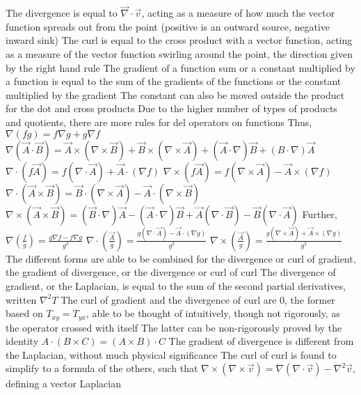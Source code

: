 \documentclass[11 pt, twoside]{article}
\newenvironment{outline*}
{
	\begin{outline}[enumerate]
	}
	{\end{outline}
}
\begin{document}
\begin{outline*}
		\3 The divergence is equal to $\vec{\nabla} \cdot \vec{v}$, acting as a measure of how much the vector function spreads out from the point (positive is an outward source, negative inward sink)
		\3 The curl is equal to the cross product with a vector function, acting as a measure of the vector function swirling around the point, the direction given by the right hand rule
	\2 The gradient of a function sum or a constant multiplied by a function is equal to the sum of the gradients of the functions or the constant multiplied by the gradient
		\3 The constant can also be moved outside the product for the dot and cross products
	\2 Due to the higher number of types of products and quotients, there are more rules for del operators on functions
		\3 Thus, $\nabla(fg) = f\nabla g + g\nabla f$
			\4 $\nabla(\vec{A} \cdot \vec{B}) = \vec{A} \times (\nabla \times \vec{B}) + \vec{B} \times (\nabla \times \vec{A}) + (\vec{A} \cdot \nabla)\vec{B} + (B \cdot \nabla)\vec{A}$
			\4 $\nabla \cdot (f\vec{A}) = f(\nabla \cdot \vec{A}) + \vec{A} \cdot (\nabla f)$
			\4 $\nabla \times (f\vec{A}) = f(\nabla \times \vec{A}) - \vec{A} \times (\nabla f)$
			\4 $\nabla \cdot (\vec{A} \times \vec{B}) = \vec{B} \cdot (\nabla \times \vec{A}) - \vec{A} \cdot (\nabla \times \vec{B})$
			\4 $\nabla \times (\vec{A} \times \vec{B}) = (\vec{B} \cdot \nabla)\vec{A} - (\vec{A} \cdot \nabla)\vec{B} + \vec{A}(\nabla \cdot \vec{B}) - \vec{B}(\nabla \cdot \vec{A})$
		\3 Further, $\nabla (\frac{f}{g}) = \frac{g\nabla f - f\nabla g}{g^2}$
			\4 $\nabla \cdot (\frac{\vec{A}}{g}) = \frac{g(\nabla \cdot \vec{A}) - \vec{A} \cdot (\nabla g)}{g^2}$
			\4 $\nabla \times (\frac{\vec{A}}{g}) = \frac{g(\nabla \times \vec{A}) + \vec{A} \times (\nabla g)}{g^2}$
	\2 The different forms are able to be combined for the divergence or curl of gradient, the gradient of divergence, or the divergence or curl of curl
		\3 The divergence of gradient, or the Laplacian, is equal to the sum of the second partial derivatives, written $\nabla^2 T$
		\3 The curl of gradient and the divergence of curl are 0, the former based on $T_{xy} = T_{yx}$, able to be thought of intuitively, though not rigorously, as the operator crossed with itself
			\4 The latter can be non-rigorously proved by the identity $A \cdot (B \times C) = (A \times B) \cdot C$
		 The gradient of divergence is different from the Laplacian, without much physical significance
		\3 The curl of curl is found to simplify to a formula of the others, such that $\nabla \times (\nabla \times \vec{v}) = \nabla(\nabla \cdot \vec{v}) - \nabla^2 \vec{v}$, defining a vector Laplacian

\end{outline*}
\end{document}

